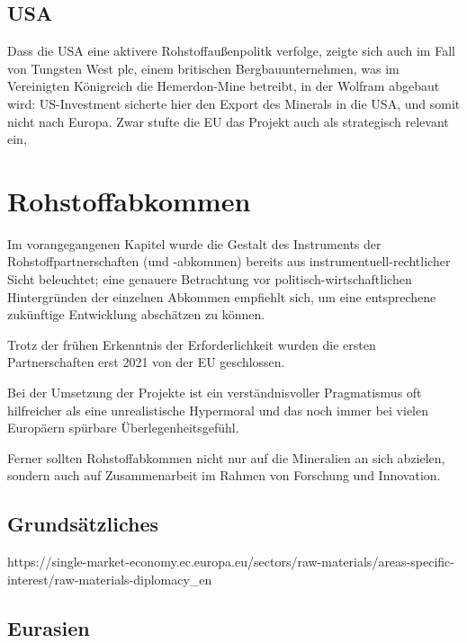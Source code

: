 \documentclass[12pt,a4paper,oneside]{book} %
\begin{document}
\subsection{USA}

Dass die USA eine aktivere Rohstoffaußenpolitk verfolge, zeigte sich auch im Fall von Tungsten West plc, einem britischen Bergbauunternehmen, was im Vereinigten Königreich die Hemerdon-Mine betreibt, in der Wolfram abgebaut wird: US-Investment sicherte hier den Export des Minerals in die USA, und somit nicht nach Europa. Zwar stufte die EU das Projekt auch als strategisch relevant ein,



\section{Rohstoffabkommen}
Im vorangegangenen Kapitel wurde die Gestalt des Instruments der Rohstoffpartnerschaften (und -abkommen) bereits aus instrumentuell-rechtlicher Sicht beleuchtet; eine genauere Betrachtung vor politisch-wirtschaftlichen Hintergründen der einzelnen Abkommen empfiehlt sich, um eine entsprechene zukünftige Entwicklung abschätzen zu können.

Trotz der frühen Erkenntnis der Erforderlichkeit wurden die ersten Partnerschaften erst 2021 von der EU geschlossen.

\glqq Bei der Umsetzung der Projekte ist ein verständnisvoller Pragmatismus oft hilfreicher als eine unrealistische Hypermoral und das noch immer bei vielen Europäern spürbare Überlegenheitsgefühl.\grqq \autocite{https://www.africa-business-guide.de/de/praxis/erfahrungen/schluesselrolle-afrikas-bedeutung-bei-den-kritischen-rohstoffen--1920084}

Ferner sollten Rohstoffabkommen nicht nur auf die Mineralien an sich abzielen, sondern auch auf Zusammenarbeit im Rahmen von Forschung und Innovation.\autocite{ÖAW}

\subsection{Grundsätzliches}

https://single-market-economy.ec.europa.eu/sectors/raw-materials/areas-specific-interest/raw-materials-diplomacy_en

\subsection{Eurasien}
\end{document}
